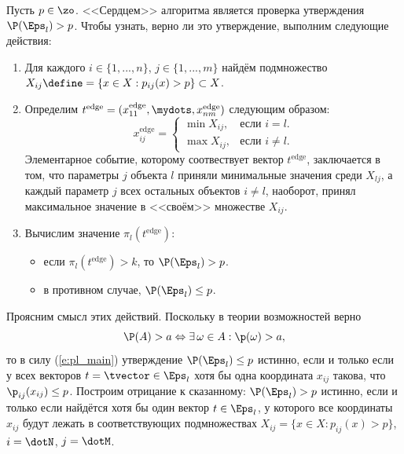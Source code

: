 Пусть $p \in \zo$. <<Сердцем>> алгоритма является проверка утверждения $\P(\Eps_l) > p$. Чтобы узнать, верно ли это утверждение, выполним следующие действия: 
\begin{enumerate}
  \item 
  Для каждого $i \in \{1, ..., n\}$, $j \in \{1, ..., m\}$ найдём подмножество $X_{ij} \define= \{x \in X: p_{ij}(x) > p\} \subset X$. 
  \item 
  Определим $t^\text{edge} = (x_{11}^\text{edge}, \mydots, x_{nm}^\text{edge})$ следующим образом:
  \begin{equation*}
    x_{ij}^\text{edge} =
    \begin{cases}
      \min X_{ij}, &\text{если $i = l$.}\\
      \max X_{ij}, &\text{если $i \neq l$.} 
    \end{cases}
  \end{equation*}
  Элементарное событие, которому соотвествует вектор $t^\text{edge}$, заключается в том, что параметры $j$ объекта $l$ приняли минимальные значения среди $X_{lj}$, а каждый параметр $j$ всех остальных объектов $i \neq l$, наоборот, принял максимальное значение в <<своём>> множестве $X_{ij}$. 
  \item	%
  Вычислим значение $\pi_l(t^\text{edge})$: 
 	\begin{itemize}
		\item если $\pi_l(t^\text{edge}) > k$, то $\P(\Eps_l) > p$.
		\item в противном случае, $\P(\Eps_l) \leq p$.
	\end{itemize} 
\end{enumerate}  

Проясним смысл этих действий. Поскольку в теории возможностей верно
\begin{equation*}
  \P(A) > a \Leftrightarrow \exists\, \omega \in A: \p(\omega) > a,
\end{equation*}
то в силу (\ref{e:pl_main}) утверждение $\P(\Eps_l) \leq p$ истинно, если и только если у всех векторов $t = \tvector \in \Eps_l$ хотя бы одна координата $x_{ij}$ такова, что $\p_{ij}(x_{ij}) \leq p$. Построим отрицание к сказанному: $\P(\Eps_l) > p$ истинно, если и только если найдётся хотя бы один вектор $t \in \Eps_l$, у которого все координаты $x_{ij} $ будут лежать в соответствующих подмножествах $X_{ij} = \{x \in X: p_{ij}(x) > p\}$, $i = \dotN$, $j = \dotM$.


